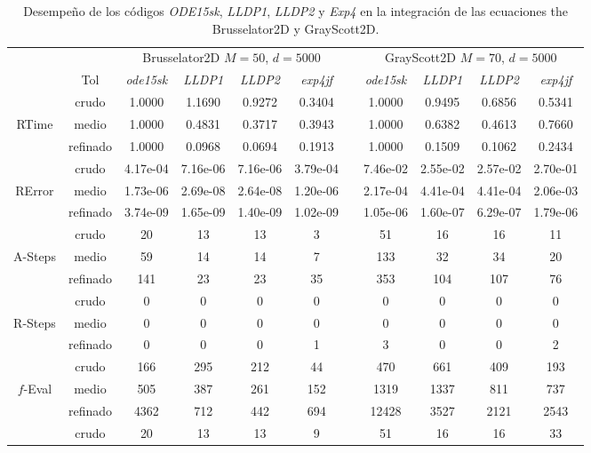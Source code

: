 \begin{table}
	\caption{Desempeño de los códigos \emph{ODE15sk}, \emph{LLDP1}, \emph{LLDP2} y \emph{Exp4} en la integración de las ecuaciones the Brusselator2D y GrayScott2D.}
	\label{tab:bruss2DGrayScott}
	\begin{adjustbox}{width=0.95\columnwidth,center}
		\begin{tabular}{ccccccccccc}
			\hline
			&  & \multicolumn{4}{c}{Brusselator2D $M=50$, $d=5000$} &  & \multicolumn{4}{c}{GrayScott2D $M=70$, $d=5000$} \\
			\cline{3-6}\cline{8-11} & Tol & \emph{ode15sk} & \emph{LLDP1} & \emph{LLDP2} & \emph{exp4jf} &  & \emph{ode15sk} & \emph{LLDP1} & \emph{LLDP2} & \emph{exp4jf} \\
			\hline
			& crudo & 1.0000 & 1.1690 & 0.9272 & 0.3404 &  & 1.0000 & 0.9495 & 0.6856 & 0.5341 \\
			RTime & medio & 1.0000 & 0.4831 & 0.3717 & 0.3943 &  & 1.0000 & 0.6382 & 0.4613 & 0.7660 \\
			& refinado & 1.0000 & 0.0968 & 0.0694 & 0.1913 &  & 1.0000 & 0.1509 & 0.1062 & 0.2434 \\
			\hline
			& crudo & 4.17e-04 & 7.16e-06 & 7.16e-06 & 3.79e-04 &  & 7.46e-02 & 2.55e-02 & 2.57e-02 & 2.70e-01 \\
			RError & medio & 1.73e-06 & 2.69e-08 & 2.64e-08 & 1.20e-06 &  & 2.17e-04 & 4.41e-04 & 4.41e-04 & 2.06e-03 \\
			& refinado & 3.74e-09 & 1.65e-09 & 1.40e-09 & 1.02e-09 &  & 1.05e-06 & 1.60e-07 & 6.29e-07 & 1.79e-06 \\
			\hline
			& crudo & 20 & 13 & 13 & 3 &  & 51 & 16 & 16 & 11 \\
			A-Steps & medio & 59 & 14 & 14 & 7 &  & 133 & 32 & 34 & 20 \\
			& refinado & 141 & 23 & 23 & 35 &  & 353 & 104 & 107 & 76 \\
			\hline
			& crudo & 0 & 0 & 0 & 0 &  & 0 & 0 & 0 & 0 \\
			R-Steps & medio & 0 & 0 & 0 & 0 &  & 0 & 0 & 0 & 0 \\
			& refinado & 0 & 0 & 0 & 1 &  & 3 & 0 & 0 & 2 \\
			\hline
			& crudo & 166 & 295 & 212 & 44 &  & 470 & 661 & 409 & 193 \\
			$f$-Eval & medio & 505 & 387 & 261 & 152 &  & 1319 & 1337 & 811 & 737 \\
			& refinado & 4362 & 712 & 442 & 694 &  & 12428 & 3527 & 2121 & 2543 \\
			\hline
			& crudo & 20 & 13 & 13 & 9 &  & 51 & 16 & 16 & 33 \\

\end{tabular}
\end{adjustbox}
\end{table}
